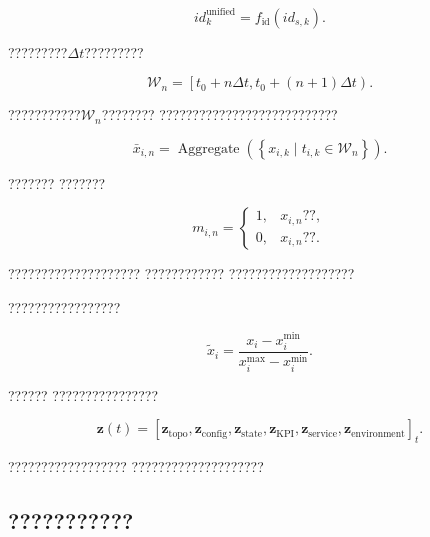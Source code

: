 \begin{equation}
id_k^{\mathrm{unified}}
=
f_{\mathrm{id}}
\left(
id_{s,k}
\right).
\label{eq:entity_identifier_alignment}
\end{equation}

?????????$\Delta t$?????????

\begin{equation}
\mathcal{W}_n
=
\left[
t_0+n\Delta t,
t_0+(n+1)\Delta t
\right).
\label{eq:time_alignment_window}
\end{equation}

???????????$\mathcal{W}_n$????????
???????????????????????????

\begin{equation}
\bar{x}_{i,n}
=
\operatorname{Aggregate}
\left(
\left\{
x_{i,k}
\mid
t_{i,k}\in\mathcal{W}_n
\right\}
\right).
\label{eq:time_window_aggregation}
\end{equation}

???????
???????

\begin{equation}
m_{i,n}
=
\begin{cases}
1, & x_{i,n}\text{??},\\
0, & x_{i,n}\text{??}.
\end{cases}
\label{eq:missing_value_indicator}
\end{equation}

????????????????????
????????????
???????????????????

?????????????????

\begin{equation}
\tilde{x}_{i}
=
\frac{x_i-x_i^{\min}}
{x_i^{\max}-x_i^{\min}}.
\label{eq:feature_normalization_twin}
\end{equation}

??????
????????????????

\begin{equation}
\boldsymbol{z}(t)
=
\left[
\boldsymbol{z}_{\mathrm{topo}},
\boldsymbol{z}_{\mathrm{config}},
\boldsymbol{z}_{\mathrm{state}},
\boldsymbol{z}_{\mathrm{KPI}},
\boldsymbol{z}_{\mathrm{service}},
\boldsymbol{z}_{\mathrm{environment}}
\right]_{t}.
\label{eq:aligned_twin_feature_vector}
\end{equation}

??????????????????
????????????????????


\subsection*{???????????}


